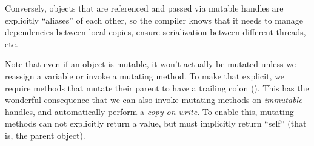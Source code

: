 \documentclass[preprint]{{sigplanconf}}
\begin{document}
Conversely, objects that are referenced and passed via mutable handles
are explicitly \textquotedblleft{}aliases\textquotedblright{} of each other, so the compiler knows that it
needs to manage dependencies between local copies, ensure serialization
between different threads, etc.%

Note that even if an object is mutable, it won't actually be mutated
unless we reassign a variable or invoke a mutating method. To make that
explicit, we require methods that mutate their parent to have a trailing
colon (). This has the wonderful consequence that we can also invoke
mutating methods on \emph{immutable} handles, and automatically perform a
\emph{copy-on-write}. To enable this, mutating methods can not explicitly
return a value, but must implicitly return \textquotedblleft{}self\textquotedblright{} (that is, the parent
object).%
\end{document}
